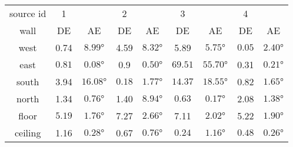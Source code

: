 \begin{tabular}{c|cc|cc|cc|cc}
\toprule
source id &	1	& &	2	& &	3	& &	4 &	\\
wall &	DE&	AE&	DE&	AE&	DE&	AE&	DE&	AE\\
\hline
west &	0.74	& $\ang{8.99}$      & 4.59	& $\ang{8.32}$  & 5.89	& $\ang{5.75}$	& $\mathbf{0.05}$    & $\mathbf{\ang{2.40}}$\\
east &	$\mathbf{0.81}$	& $\mathbf{\ang{0.08}}$      & 0.9	& $\ang{0.50}$	&$\mathit{69.51}$	& $\mathit{\ang{55.70}}$	& 0.31    & $\ang{0.21}$\\
south&	3.94	&$\ang{16.08}$      & $\mathbf{0.18}$	& $\ang{1.77}$	&$\mathit{14.37}$ & $\mathit{\ang{18.55}}$	& 0.82    & $\mathbf{\ang{1.65}}$\\
north&	1.34	& $\ang{0.76}$	    & 1.40	& $\ang{8.94}$	& $\mathbf{0.63}$	& $\mathbf{\ang{0.17}}$	& 2.08    & $\ang{1.38}$\\
floor&	$\mathbf{5.19}$	& $\mathbf{\ang{1.76}}$	    & 7.27	& $\ang{2.66}$	& 7.11	& $\ang{2.02}$	& 5.22    & $\ang{1.90}$\\
ceiling&1.16	& $\ang{0.28}$	    & 0.67	& $\ang{0.76}$	& $\mathbf{0.24}$	& $\ang{1.16}$	& $0.48$    & $\mathbf{\ang{0.26}}$\\

\bottomrule
\end{tabular}
